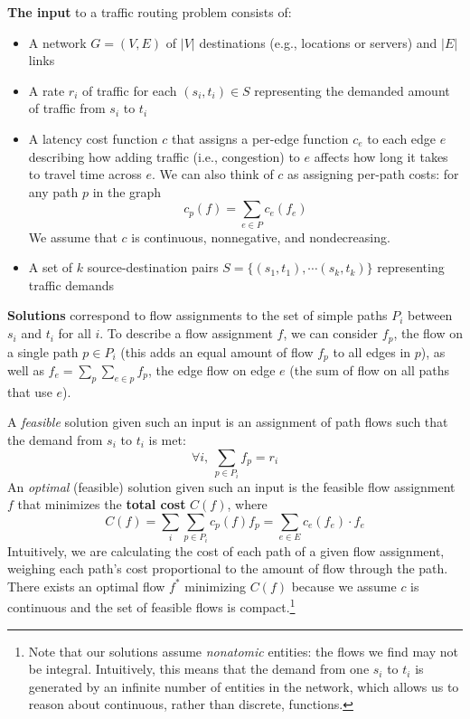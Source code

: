 \documentclass[acmlarge]{acmart}
\begin{document}
\medskip\noindent
\textbf{The input} to a traffic routing problem consists of:
\begin{itemize}
    \item A network $G = (V, E)$ of $|V|$ destinations (e.g., locations or servers) and $|E|$ links 
    \item A {rate} $r_i$ of traffic for each $(s_i,t_i)\in S$ representing the demanded amount of traffic from $s_i$ to $t_i$
    \item A {latency} cost function $c$ that assigns a per-edge function $c_e$ to each edge $e$ describing how adding traffic (i.e., congestion) to $e$ affects how long it takes to travel time across $e$. We can also think of $c$ as assigning per-path costs: for any path $p$ in the graph
        $$c_p(f) = \sum_{e\in P}c_e(f_e)$$ 
        We assume that $c$ is continuous, nonnegative, and nondecreasing.
    \item A set of $k$ source-destination pairs $S=\{(s_1,t_1), \cdots (s_k,t_k)\}$ representing traffic demands
\end{itemize}

\medskip\noindent
\textbf{Solutions} correspond to flow assignments to the set of simple paths $P_i$ between $s_i$ and $t_i$ for all $i$. To describe a flow assignment $f$, we can consider $f_p$, the flow on a single path $p \in P_i$ (this adds an equal amount of flow $f_p$ to all edges in $p$), as well as $f_e = \sum_p \sum_{e\in p} f_p$, the edge flow on edge $e$ (the sum of flow on all paths that use $e$).

   A \emph{feasible} solution given such an input is an assignment of path flows such that the demand from $s_i$ to $t_i$ is met:
$$\forall i,~\sum_{p\in P_i} f_p = r_i$$
   An \emph{optimal} (feasible) solution given such an input is the feasible flow assignment $f$ that minimizes the \textbf{total cost} $C(f)$, where
$$C(f) = \sum_i\sum_{p\in P_i}c_p(f)f_p = \sum_{e\in E} c_e(f_e)\cdot f_e$$
Intuitively, we are calculating the cost of each path of a given flow assignment, weighing 
each path's cost proportional to the amount of flow through the path.
There exists an optimal flow $f^*$ minimizing $C(f)$ because we assume $c$ is continuous and the set of feasible flows is compact.\footnote{Note that our solutions assume \emph{nonatomic} entities: the flows we find may not be integral. 
Intuitively, this means that the demand from one $s_i$ to $t_i$ is generated by an infinite number
of entities in the network, which allows us to reason about continuous, rather than discrete, functions.}
\end{document}
